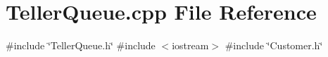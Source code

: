 \section{Teller\+Queue.\+cpp File Reference}
\label{TellerQueue_8cpp}
{\ttfamily \#include \char`\"{}Teller\+Queue.\+h\char`\"{}}\newline
{\ttfamily \#include $<$iostream$>$}\newline
{\ttfamily \#include \char`\"{}Customer.\+h\char`\"{}}\newline
